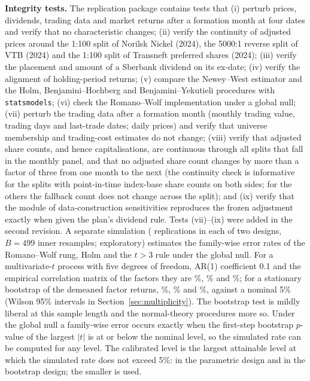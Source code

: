 \documentclass[11pt]{article}
\newcommand{\RW}{Romano--Wolf}
\begin{document}
\textbf{Integrity tests.} The replication package contains tests that (i) perturb prices, dividends, trading data and
market returns after a formation month at four dates and verify that no characteristic changes; (ii) verify the continuity of adjusted prices around the 1:100
split of Norilsk Nickel (2024), the 5000:1 reverse split of VTB (2024) and the 1:100 split of Transneft preferred shares
(2024); (iii) verify the placement and amount of a Sberbank dividend on its ex-date; (iv) verify the alignment of
holding-period returns; (v) compare the Newey--West estimator and the Holm, Benjamini--Hochberg and Benjamini--Yekutieli
procedures with \texttt{statsmodels}; (vi) check the \RW{} implementation under a global null; (vii) perturb the trading
data after a formation month (monthly trading value, trading days and last-trade dates; daily prices) and verify that
universe membership and trading-cost estimates do not change; (viii) verify that adjusted share counts, and hence
capitalisations, are continuous through all  splits that fall in the monthly panel, and that no
adjusted share count changes by more than a factor of three from one month to the next (the continuity check is
informative for the  splits with point-in-time index-base share counts on both sides; for the others the
fallback count does not change across the split); and (ix) verify that the module of data-construction sensitivities
reproduces the frozen adjustment exactly when given the plan's dividend rule. Tests (vii)--(ix) were added in the
second revision. A separate
simulation ( replications in each of two designs, $B=499$ inner resamples; exploratory) estimates the
family-wise error rates of the \RW{} rung, Holm and the $t>3$ rule under the global null. For a multivariate-$t$
process with five degrees of freedom, AR(1) coefficient 0.1 and the empirical correlation matrix of the factors they are
\%, \% and \%; for a stationary bootstrap of the demeaned factor returns,
\%, \% and \%, against a nominal 5\% (Wilson 95\% intervals in
Section~\ref{sec:multiplicity}). The bootstrap test is mildly liberal at this sample length and the normal-theory
procedures more so. Under the global null a family-wise error occurs exactly when the first-step bootstrap $p$-value
of the largest $|t|$ is at or below the nominal level, so the simulated rate can be computed for any level. The
calibrated level is the largest attainable level at which the simulated rate does not exceed 5\%:
 in the parametric design and  in the bootstrap design; the smaller is used.
\end{document}
